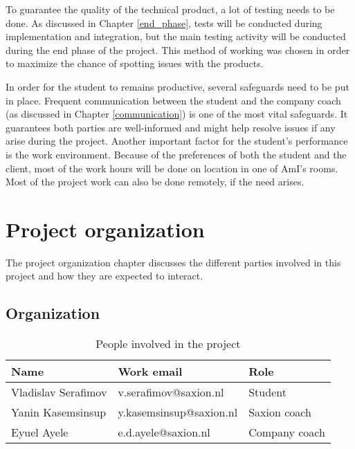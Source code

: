 \documentclass{report}
\begin{document}
	To guarantee the quality of the technical product, a lot of testing needs to be done. As discussed in Chapter \ref{end_phase}, tests will be conducted during implementation and integration, but the main testing activity will be conducted during the end phase of the project. This method of working was chosen in order to maximize the chance of spotting issues with the products.
	
	In order for the student to remains productive, several safeguards need to be put in place. Frequent communication between the student and the company coach (as discussed in Chapter \ref{communication}) is one of the most vital safeguards. It guarantees both parties are well-informed and might help resolve issues if any arise during the project. Another important factor for the student's performance is the work environment. Because of the preferences of both the student and the client, most of the work hours will be done on location in one of AmI's rooms. Most of the project work can also be done remotely, if the need arises.
	
	
	
	\chapter{Project organization}
	The project organization chapter discusses the different parties involved in this project and how they are expected to interact.
	
	\section{Organization}
	
	\begin{table}[h]
		\centering
		\begin{tabular}{|l|l|l|}
			\hline
			Name                & Work email              & Role          \\ \hline
			Vladislav Serafimov & v.serafimov@saxion.nl   & Student       \\ \hline
			Yanin Kasemsinsup   & y.kasemsinsup@saxion.nl & Saxion coach  \\ \hline
			Eyuel Ayele         & e.d.ayele@saxion.nl     & Company coach \\ \hline
		\end{tabular}
		\caption{People involved in the project}
		\label{involved}
	\end{table}
	
\end{document}
